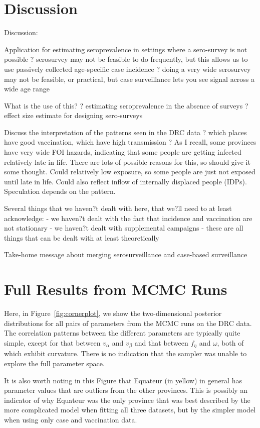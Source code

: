 \documentclass[nofootinbib,aps,pre,twocolumn,superscriptaddress,showkeys,showpacs]{revtex4-1}
\begin{document}
\section{Discussion \label{sec:Discussion}}
Discussion:

Application for estimating seroprevalence in settings where a sero-survey is not possible 
	? serosurvey may not be feasible to do frequently, but this allows us to use passively collected age-specific case incidence 
	? doing a very wide serosurvey may not be feasible, or practical, but case surveillance lets you see signal across a wide age range

What is the use of this?
	? estimating seroprevalence in the absence of surveys
	? effect size estimate for designing sero-surveys

Discuss the interpretation of the patterns seen in the DRC data 
	? which places have good vaccination, which have high transmission
	? As I recall, some provinces have very wide FOI hazards, indicating that some people are getting infected relatively late in life.  There are lots of possible reasons for this, so should give it some thought.  Could relatively low exposure, so some people are just not exposed until late in life.  Could also reflect inflow of internally displaced people (IDPs).  Speculation depends on the pattern. 

Several things that we haven?t dealt with here, that we?ll need to at least acknowledge:
	- we haven?t dealt with the fact that incidence and vaccination are not stationary
	- we haven?t dealt with supplemental campaigns
	- these are all things that can be dealt with at least theoretically

Take-home message about merging serosurveillance and case-based surveillance

\appendix*
    \section{Full Results from MCMC Runs}
Here, in Figure~\ref{fig:cornerplot}, we show the two-dimensional posterior distributions for all pairs of parameters from the MCMC runs on the DRC data. The correlation patterns between the different parameters are typically quite simple, except for that between $v_\alpha$ and $v_\beta$ and that between $f_\eta$ and $\omega$, both of which exhibit curvature. There is no indication that the sampler was unable to explore the full parameter space.

It is also worth noting in this Figure that Equateur (in yellow) in general has parameter values that are outliers from the other provinces. This is possibly an indicator of why Equateur was the only province that was best described by the more complicated model when fitting all three datasets, but by the simpler model when using only case and vaccination data.
\end{document}
